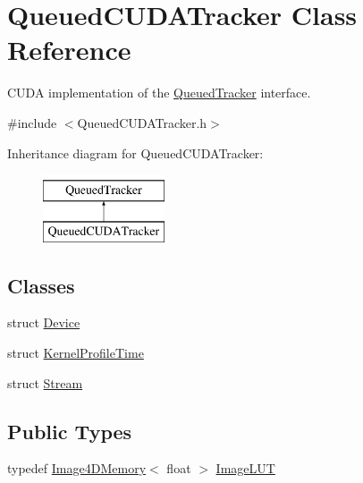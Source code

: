 \hypertarget{class_queued_c_u_d_a_tracker}{}\section{Queued\+C\+U\+D\+A\+Tracker Class Reference}
\label{class_queued_c_u_d_a_tracker}


C\+U\+DA implementation of the \hyperlink{class_queued_tracker}{Queued\+Tracker} interface.  




{\ttfamily \#include $<$Queued\+C\+U\+D\+A\+Tracker.\+h$>$}

Inheritance diagram for Queued\+C\+U\+D\+A\+Tracker\+:\begin{figure}[H]
\begin{center}
\leavevmode
\includegraphics[height=2.000000cm]{class_queued_c_u_d_a_tracker}
\end{center}
\end{figure}
\subsection*{Classes}
\begin{DoxyCompactItemize}
\item 
struct \hyperlink{struct_queued_c_u_d_a_tracker_1_1_device}{Device}
\item 
struct \hyperlink{struct_queued_c_u_d_a_tracker_1_1_kernel_profile_time}{Kernel\+Profile\+Time}
\item 
struct \hyperlink{struct_queued_c_u_d_a_tracker_1_1_stream}{Stream}
\end{DoxyCompactItemize}
\subsection*{Public Types}
\begin{DoxyCompactItemize}
\item 
typedef \hyperlink{class_image4_d_memory}{Image4\+D\+Memory}$<$ float $>$ \hyperlink{class_queued_c_u_d_a_tracker_ab96308f9c1c47ab60b3a7e8da3e4c104}{Image\+L\+UT}
\end{DoxyCompactItemize}
